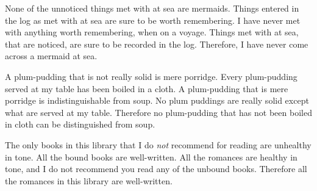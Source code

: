 \begin{exercises}

\item \label{itm:mermaids} None of the unnoticed things met with at sea are mermaids. Things entered in the log as met with at sea are sure to be worth remembering. I have never met with anything worth remembering, when on a voyage. Things met with at sea, that are noticed, are sure to be recorded in the log. Therefore, I have never come across a mermaid at sea. %






\item \label{itm:plum-pudding} A plum-pudding that is not really solid is mere porridge. Every plum-pudding served at my table has been boiled in a cloth. A plum-pudding that is mere porridge is indistinguishable from soup. No plum puddings are really solid except what are served at my table. Therefore no plum-pudding that has not been boiled in cloth can be distinguished from soup. %

\item \label{itm:books} The only books in this library that I do \textit{not} recommend for reading are unhealthy in tone. All the bound books are well-written. All the romances are healthy in tone, and I do not recommend you read any of the unbound books. Therefore all the romances in this library are well-written.


\end{exercises}
